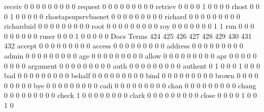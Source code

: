 \documentclass[compress,8pt]{beamer}
\begin{document}
\begin{frame}
\begin{Schunk}
  receiv                                     0   0   0   0   0   0   0   0   0
  request                                    0   0   0   0   0   0   0   0   0
  retriev                                    0   0   0   0   1   0   0   0   0
  rhost                                      0   0   0   1   0   0   0   0   0
  rhostapsupsrvbasnet                        0   0   0   0   0   0   0   0   0
  richard                                    0   0   0   0   0   0   0   0   0
  richarduid                                 0   0   0   0   0   0   0   0   0
  root                                       0   0   0   0   0   0   0   0   0
  roy                                        0   0   0   0   0   0   0   1   1
  run                                        0   0   0   0   0   0   0   0   0
  ruser                                      0   0   0   1   0   0   0   0   0
                                          Docs
Terms                                      424 425 426 427 428 429 430 431 432
  accept                                     0   0   0   0   0   0   0   0   0
  access                                     0   0   0   0   0   0   0   0   0
  address                                    0   0   0   0   0   0   0   0   0
  admin                                      0   0   0   0   0   0   0   0   0
  age                                        0   0   0   0   0   0   0   0   0
  allow                                      0   0   0   0   0   0   0   0   0
  apr                                        0   0   0   0   0   0   0   0   0
  argument                                   0   0   0   0   0   0   0   0   0
  auth                                       0   0   0   0   0   0   0   0   0
  authent                                    0   1   0   0   0   1   0   0   0
  bad                                        0   0   0   0   0   0   0   0   0
  behalf                                     0   0   0   0   0   0   0   0   0
  bind                                       0   0   0   0   0   0   0   0   0
  brown                                      0   0   0   0   0   0   0   0   0
  bye                                        0   0   0   0   0   0   0   0   0
  cadi                                       0   0   0   0   0   0   0   0   0
  chan                                       0   0   0   0   0   0   0   0   0
  chang                                      0   0   0   0   0   0   0   0   0
  check                                      1   0   0   0   0   0   0   0   0
  clark                                      0   0   0   0   0   0   0   0   0
  close                                      0   0   0   0   1   0   0   1   0

\end{Schunk}
\end{frame}
\end{document}
